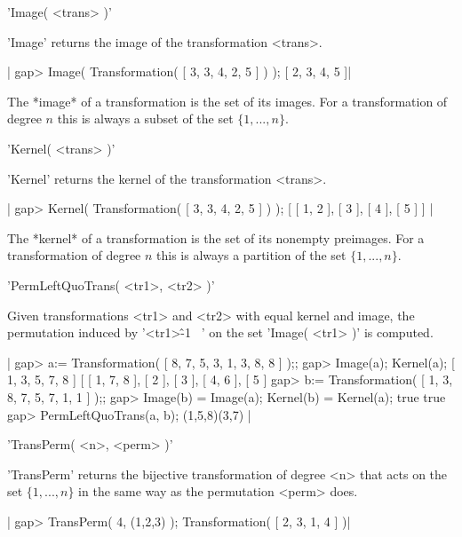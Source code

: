 
'Image( <trans> )'

'Image' returns the image of the transformation <trans>.

|    gap> Image( Transformation( [ 3, 3, 4, 2, 5 ] ) );
    [ 2, 3, 4, 5 ]|

The   *image* of  a  transformation is  the  set  of its  images.   For a
transformation of degree $n$  this is  always  a subset of the  set $\{1,
 ... , n\}$.


'Kernel( <trans> )'

'Kernel' returns the kernel of the transformation <trans>.

|    gap> Kernel( Transformation( [ 3, 3, 4, 2, 5 ] ) );
    [ [ 1, 2 ], [ 3 ], [ 4 ], [ 5 ] ] |

The *kernel*  of a transformation is the  set of its nonempty  preimages. 
For a transformation of degree $n$ this is  always a partition of the set
$\{1,  ... , n\}$.


'PermLeftQuoTrans( <tr1>, <tr2> )'

Given transformations <tr1> and  <tr2> with equal  kernel and  image, the
permutation induced by '<tr1>\^-1 \*\ <tr2>'  on the set 'Image( <tr1> )'
is computed.

|    gap> a:= Transformation( [ 8, 7, 5, 3, 1, 3, 8, 8 ] );;
    gap> Image(a);  Kernel(a);
    [ 1, 3, 5, 7, 8 ]
    [ [ 1, 7, 8 ], [ 2 ], [ 3 ], [ 4, 6 ], [ 5 ] 
    gap> b:= Transformation( [ 1, 3, 8, 7, 5, 7, 1, 1 ] );;
    gap> Image(b) = Image(a);  Kernel(b) = Kernel(a);
    true
    true
    gap> PermLeftQuoTrans(a, b);
    (1,5,8)(3,7) |

%

'TransPerm( <n>, <perm> )'

'TransPerm' returns the bijective transformation of  degree <n> that acts
on the set $\{1,  ... ,  n\}$ in the same way  as the permutation  <perm>
does.

|    gap> TransPerm( 4, (1,2,3) );
    Transformation( [ 2, 3, 1, 4 ] )|

